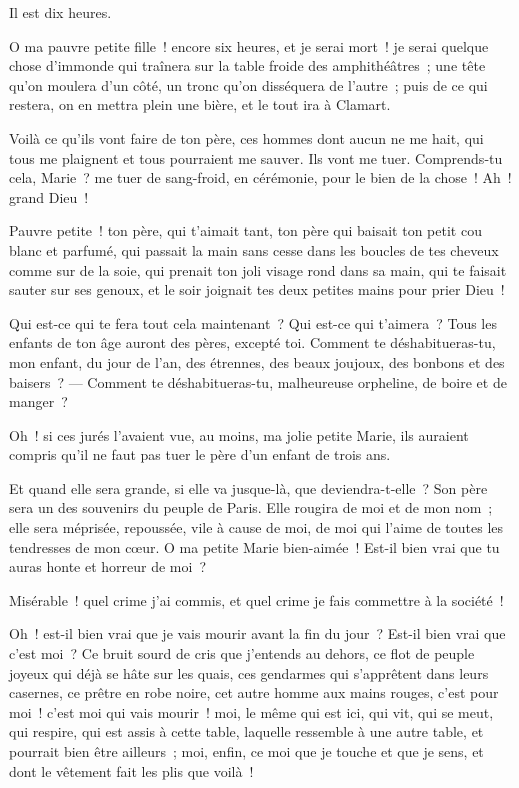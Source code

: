 \documentclass[french,twoside]{book} %
\begin{document}
\noindent Il est dix heures.\par
O ma pauvre petite fille ! encore six heures, et je serai mort ! je serai quelque chose d’immonde qui traînera sur la table froide des amphithéâtres ; une tête qu’on moulera d’un côté, un tronc qu’on disséquera de l’autre ; puis de ce qui restera, on en mettra plein une bière, et le tout ira à Clamart.\par
Voilà ce qu’ils vont faire de ton père, ces hommes dont aucun ne me hait, qui tous me plaignent et tous pourraient me sauver. Ils vont me tuer. Comprends-tu cela, Marie ? me tuer de sang-froid, en cérémonie, pour le bien de la chose ! Ah ! grand Dieu !\par
Pauvre petite ! ton père, qui t’aimait tant, ton père qui baisait ton petit cou blanc et parfumé, qui passait la main sans cesse dans les boucles de tes cheveux comme sur de la soie, qui prenait ton joli visage rond dans sa main, qui te faisait sauter sur ses genoux, et le soir joignait tes deux petites mains pour prier Dieu !\par
Qui est-ce qui te fera tout cela maintenant ? Qui est-ce qui t’aimera ? Tous les enfants de ton âge auront  des pères, excepté toi. Comment te déshabitueras-tu, mon enfant, du jour de l’an, des étrennes, des beaux joujoux, des bonbons et des baisers ? — Comment te déshabitueras-tu, malheureuse orpheline, de boire et de manger ?\par
Oh ! si ces jurés l’avaient vue, au moins, ma jolie petite Marie, ils auraient compris qu’il ne faut pas tuer le père d’un enfant de trois ans.\par
Et quand elle sera grande, si elle va jusque-là, que deviendra-t-elle ? Son père sera un des souvenirs du peuple de Paris. Elle rougira de moi et de mon nom ; elle sera méprisée, repoussée, vile à cause de moi, de moi qui l’aime de toutes les tendresses de mon cœur. O ma petite Marie bien-aimée ! Est-il bien vrai que tu auras honte et horreur de moi ?\par
Misérable ! quel crime j’ai commis, et quel crime je fais commettre à la société !\par
Oh ! est-il bien vrai que je vais mourir avant la fin du jour ? Est-il bien vrai que c’est moi ? Ce bruit sourd de cris que j’entends au dehors, ce flot de peuple joyeux qui déjà se hâte sur les quais, ces gendarmes qui s’apprêtent dans leurs casernes, ce prêtre en robe noire, cet autre homme aux mains rouges, c’est pour moi ! c’est moi qui vais mourir ! moi, le même qui est ici, qui vit, qui se meut, qui respire, qui est assis à cette table, laquelle ressemble à une autre table, et pourrait bien être ailleurs ; moi, enfin, ce moi que je touche et que je sens, et dont le vêtement fait les plis que voilà !
\end{document}
